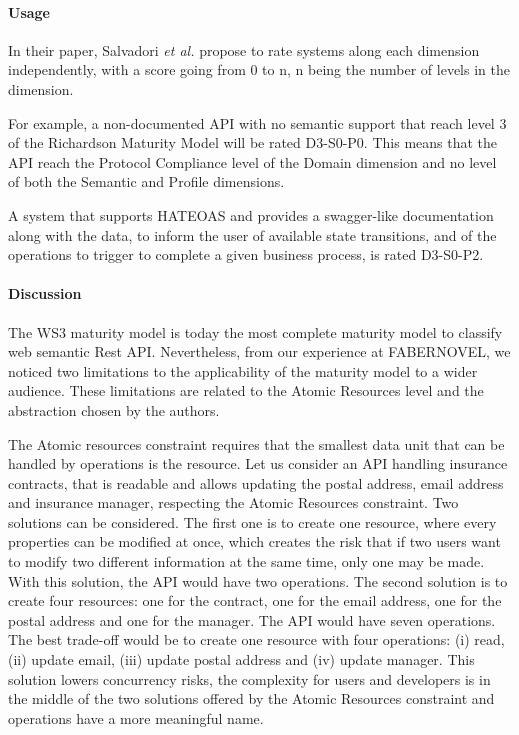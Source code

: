 \paragraph{Usage}

In their paper, Salvadori \emph{et al.} propose to rate systems along each dimension independently, with a score going from 0 to n, n being the number of levels in the dimension.

For example, a non-documented API with no semantic support that reach level 3 of the Richardson Maturity Model will be rated D3-S0-P0. This means that the API reach the Protocol Compliance level of the Domain dimension and no level of both the Semantic and Profile dimensions.


A system that supports HATEOAS and provides a swagger-like documentation along with the data, to inform the user of available state transitions, and of the operations to trigger to complete a given business process, is rated D3-S0-P2.

\paragraph{Discussion}

The WS3 maturity model is today the most complete maturity model to classify web semantic Rest API. Nevertheless, from our experience at FABERNOVEL, we noticed two limitations to the applicability of the maturity model to a wider audience. These limitations are related to the Atomic Resources level and the abstraction chosen by the authors.

The Atomic resources constraint requires that the smallest data unit that can be handled by operations is the resource. Let us consider an API handling insurance contracts, that is readable and allows updating the postal address, email address and insurance manager, respecting the Atomic Resources constraint.  Two solutions can be considered. The first one is to create one resource, where every properties can be modified at once, which creates the risk that if two users want to modify two different information at the same time, only one may be made. With this solution, the API would have two operations. The second solution is to create four resources: one for the contract, one for the email address, one for the postal address and one for the manager. The API would have seven operations. The best trade-off would be to create one resource with four operations: (i) read, (ii) update email, (iii) update postal address and (iv) update manager. This solution lowers concurrency risks, the complexity for users and developers is in the middle of the two solutions offered by the Atomic Resources constraint and operations have a more meaningful name.

